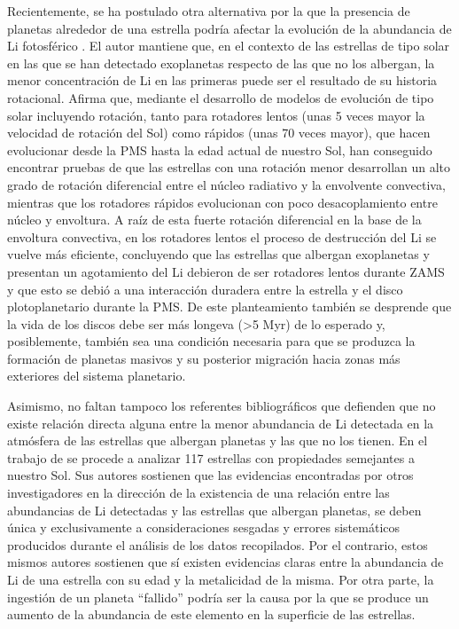Recientemente, se ha postulado otra alternativa por la que la presencia de planetas alrededor de una estrella podría afectar la evolución de la abundancia de Li fotosférico \cite{Bouvier2008}. El autor mantiene que, en el contexto de las estrellas de tipo solar en las que se han detectado exoplanetas respecto de las que no los albergan, la menor concentración de Li en las primeras puede ser el resultado de su historia rotacional. Afirma que, mediante el desarrollo de modelos de evolución de tipo solar incluyendo rotación, tanto para rotadores lentos (unas 5 veces mayor la velocidad de rotación del Sol) como rápidos (unas 70 veces mayor), que hacen evolucionar desde la PMS hasta la edad actual de nuestro Sol, han conseguido encontrar pruebas de que las estrellas con una rotación menor desarrollan un alto grado de rotación diferencial entre el núcleo radiativo y la envolvente convectiva, mientras que los rotadores rápidos evolucionan con poco desacoplamiento entre núcleo y envoltura. A raíz de esta fuerte rotación diferencial en la base de la envoltura convectiva, en los rotadores lentos el proceso de destrucción del Li se vuelve más eficiente, concluyendo que las estrellas que albergan exoplanetas y presentan un agotamiento del Li debieron de ser rotadores lentos durante ZAMS y que esto se debió a una interacción duradera entre la estrella y el disco plotoplanetario durante la PMS. De este planteamiento también se desprende que la vida de los discos debe ser más longeva (>5 Myr) de lo esperado y, posiblemente, también sea una condición necesaria para que se produzca la formación de planetas masivos y su posterior migración hacia zonas más exteriores del sistema planetario.\par

Asimismo, no faltan tampoco los referentes bibliográficos que defienden que no existe relación directa alguna entre la menor abundancia de Li detectada en la atmósfera de las estrellas que albergan planetas y las que no los tienen. En el trabajo de \cite{Baumann2010} se procede a analizar 117 estrellas con propiedades semejantes a nuestro Sol. Sus autores sostienen que las evidencias encontradas por otros investigadores en la dirección de la existencia de una relación entre las abundancias de Li detectadas y las estrellas que albergan planetas, se deben única y exclusivamente a consideraciones sesgadas y errores sistemáticos producidos durante el análisis de los datos recopilados. Por el contrario, estos mismos autores sostienen que sí existen evidencias claras entre la abundancia de Li de una estrella con su edad y la metalicidad de la misma. Por otra parte, la ingestión de un planeta “fallido” podría ser la causa por la que se produce un aumento de la abundancia de este elemento en la superficie de las estrellas.\par

